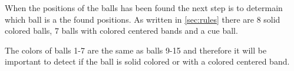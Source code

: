 When the positions of the balls has been found the next step is to determain which ball is a the found positions. As written in \ref{sec:rules} there are 8 solid colored balls, 7 balls with colored centered bands and a cue ball.

The colors of balls 1-7 are the same as balls 9-15 and therefore it will be important to detect if the ball is solid colored or with a colored centered band.